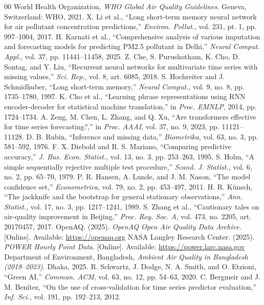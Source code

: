 \documentclass[conference]{IEEEtran}
\begin{document}
\begin{thebibliography}{00}
 World Health Organization, \emph{WHO Global Air Quality Guidelines}. Geneva, Switzerland: WHO, 2021.
 X. Li et al., ``Long short-term memory neural network for air pollutant concentration predictions,'' \emph{Environ. Pollut.}, vol. 231, pt. 1, pp. 997--1004, 2017.
 H. Karnati et al., ``Comprehensive analysis of various imputation and forecasting models for predicting PM2.5 pollutant in Delhi,'' \emph{Neural Comput. Appl.}, vol. 37, pp. 11441--11458, 2025.
 Z. Che, S. Purushotham, K. Cho, D. Sontag, and Y. Liu, ``Recurrent neural networks for multivariate time series with missing values,'' \emph{Sci. Rep.}, vol. 8, art. 6085, 2018.
 S. Hochreiter and J. Schmidhuber, ``Long short-term memory,'' \emph{Neural Comput.}, vol. 9, no. 8, pp. 1735--1780, 1997.
 K. Cho et al., ``Learning phrase representations using RNN encoder-decoder for statistical machine translation,'' in \emph{Proc. EMNLP}, 2014, pp. 1724--1734.
 A. Zeng, M. Chen, L. Zhang, and Q. Xu, ``Are transformers effective for time series forecasting?,'' in \emph{Proc. AAAI}, vol. 37, no. 9, 2023, pp. 11121--11128.
 D. B. Rubin, ``Inference and missing data,'' \emph{Biometrika}, vol. 63, no. 3, pp. 581--592, 1976.
 F. X. Diebold and R. S. Mariano, ``Comparing predictive accuracy,'' \emph{J. Bus. Econ. Statist.}, vol. 13, no. 3, pp. 253--263, 1995.
 S. Holm, ``A simple sequentially rejective multiple test procedure,'' \emph{Scand. J. Statist.}, vol. 6, no. 2, pp. 65--70, 1979.
 P. R. Hansen, A. Lunde, and J. M. Nason, ``The model confidence set,'' \emph{Econometrica}, vol. 79, no. 2, pp. 453--497, 2011.
 H. R. K\"{u}nsch, ``The jackknife and the bootstrap for general stationary observations,'' \emph{Ann. Statist.}, vol. 17, no. 3, pp. 1217--1241, 1989.
 S. Zhang et al., ``Cautionary tales on air-quality improvement in Beijing,'' \emph{Proc. Roy. Soc. A}, vol. 473, no. 2205, art. 20170457, 2017.
 OpenAQ. (2025). \emph{OpenAQ Open Air Quality Data Archive}. [Online]. Available: \url{https://openaq.org}
 NASA Langley Research Center. (2025). \emph{POWER Hourly Point Data}. [Online]. Available: \url{https://power.larc.nasa.gov}
 Department of Environment, Bangladesh, \emph{Ambient Air Quality in Bangladesh (2018--2023)}. Dhaka, 2025.
 R. Schwartz, J. Dodge, N. A. Smith, and O. Etzioni, ``Green AI,'' \emph{Commun. ACM}, vol. 63, no. 12, pp. 54--63, 2020.
 C. Bergmeir and J. M. Ben\'{i}tez, ``On the use of cross-validation for time series predictor evaluation,'' \emph{Inf. Sci.}, vol. 191, pp. 192--213, 2012.
\end{thebibliography}
\end{document}
